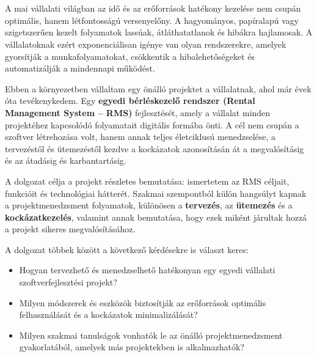 \chapter{\bevezetes}

A mai vállalati világban az idő és az erőforrások hatékony kezelése nem csupán optimális, hanem létfontosságú versenyelőny. 
A hagyományos, papíralapú vagy szigetszerűen kezelt folyamatok lassúak, átláthatatlanok és hibákra hajlamosak. 
A vállalatoknak ezért exponenciálisan igénye van olyan rendszerekre, amelyek gyorsítják a munkafolyamatokat, csökkentik 
a hibalehetőségeket és automatizálják a mindennapi működést.

Ebben a környezetben vállaltam egy önálló projektet a vállalatnak, ahol már évek óta tevékenykedem.
Egy \textbf{egyedi bérléskezelő rendszer (Rental Management System – RMS)} fejlesztését, 
amely a vállalat minden projektéhez kapcsolódó folyamatait digitális formába önti. 
A cél nem csupán a szoftver létrehozása volt, hanem annak teljes életciklusú menedzselése, 
a tervezéstől és ütemezéstől kezdve a kockázatok azonosításán át a megvalósításig és az átadásig és karbantartásig.

A dolgozat célja a projekt részletes bemutatása: ismertetem az RMS céljait, funkcióit és technológiai hátterét. 
Szakmai szempontból külön hangsúlyt kapnak a projektmenedzsment folyamatok, 
különösen a \textbf{tervezés}, az \textbf{ütemezés} és a \textbf{kockázatkezelés}, valamint annak bemutatása, 
hogy ezek miként járultak hozzá a projekt sikeres megvalósításához.

\vspace{1em}
\noindent A dolgozat többek között a következő kérdésekre is választ keres:
\begin{itemize}
    \item Hogyan tervezhető és menedzselhető hatékonyan egy egyedi vállalati szoftverfejlesztési projekt?
    \item Milyen módszerek és eszközök biztosítják az erőforrások optimális felhasználását és a kockázatok minimalizálását?
    \item Milyen szakmai tanulságok vonhatók le az önálló projektmenedzsment gyakorlatából, amelyek más projektekben is alkalmazhatók?
\end{itemize}

